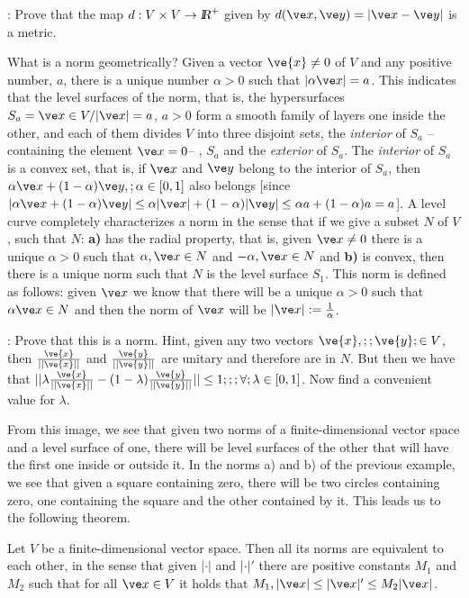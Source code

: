 \ejer: Prove that the map $d:V\times V \to \mbox{\sl {l$\!\!\!\;\:\!$R}}^+$ given by $d(\ve x,\ve y) = |\ve x-\ve y|$ is a metric.

What is a norm geometrically? Given a vector $\ve{x}\neq 0$ of $V$ and any positive number, $a$, there is a unique number $\alpha > 0$ such that $|\alpha \ve x|=a$. This indicates that the level surfaces of the norm, that is, the hypersurfaces $S_a={\ve x\in V / |\ve x|=a}$, $a>0$ form a smooth family of layers one inside the other, and each of them divides $V$ into three disjoint sets, the {\it interior} of $S_a$ --containing the element $\ve x=0$-- , $S_a$ and the {\it exterior} of $S_a$. The {\it interior} of $S_a$ is a convex set, that is, if $\ve x$ and $\ve y$ belong to the interior of $S_a$, then $\alpha \ve x+(1-\alpha)\ve y,;\alpha\in[0,1]$ also belongs [since $|\alpha \ve x + (1-\alpha )\ve y| \leq \alpha |\ve x| + (1-\alpha )|\ve y| \leq \alpha a + (1-\alpha )a = a$].
A level curve completely characterizes a norm in the sense that if we give a subset $N$ of $V$, such that $N$: \textbf{a)} has the radial property, that is, given $\ve x\neq 0$ there is a unique $\alpha >0$ such that $\alpha ,\ve x\in N$ and $-\alpha ,\ve x\in N$ and \textbf{b)} is convex, then there is a unique norm such that $N$ is the level surface $S_1$. This norm is defined as follows: given $\ve x$ we know that there will be a unique $\alpha > 0$ such that $\alpha \ve x \in N$ and then the norm of $\ve x$ will be $|\ve x| := \frac1{\alpha}$.

\ejer: Prove that this is a norm. Hint, given any two vectors $\ve{x},;; \ve{y} ; \in V$, then $\frac{\ve{x}}{||\ve{x}||}$ and $\frac{\ve{y}}{||\ve{y}||}$ are unitary and therefore are in $N$. But then we have that $||\lambda \frac{\ve{x}}{||\ve{x}||} - (1-\lambda)\frac{\ve{y}}{||\ve{y}||}|| \leq 1;;;\forall ; \lambda \in [0,1]$. Now find a convenient value for $\lambda$.

From this image, we see that given two norms of a finite-dimensional vector space and a level surface of one, there will be level surfaces of the other that will have the first one inside or outside it. In the norms a) and b) of the previous example, we see that given a square containing zero, there will be two circles containing zero, one containing the square and the other contained by it. This leads us to the following theorem.

\bteo Let $V$ be a finite-dimensional vector space. Then all its norms are equivalent to each other, in the sense that given $|\cdot|$ and $|\cdot|'$ there are positive constants $M_1$ and $M_2$ such that for all $\ve x\in V$ it holds that $M_1,|\ve x|\leq|\ve x|'\leq M_2|\ve x|$. \eteo

